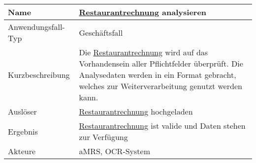 \begin{table}[H]
    \centering
    \label{}
    \begin{tabularx}{\textwidth}{| l | X |}
        \hline
        Name               & \hyperref[gls:restaurantRechnung]{Restaurantrechnung} analysieren                                                                                                                                                       \\
        \hline
        Anwendungsfall-Typ & Geschäftsfall                                                                                                                                                                                                           \\
        \hline
        Kurzbeschreibung   & Die \hyperref[gls:restaurantRechnung]{Restaurantrechnung} wird auf das Vorhandensein aller Pflichtfelder überprüft. Die Analysedaten werden in ein Format gebracht, welches zur Weiterverarbeitung genutzt werden kann. \\
        \hline
        Auslöser           & \hyperref[gls:restaurantRechnung]{Restaurantrechnung} hochgeladen                                                                                                                                                       \\
        \hline
        Ergebnis           & \hyperref[gls:restaurantRechnung]{Restaurantrechnung} ist valide und Daten stehen zur Verfügung                                                                                                                         \\
        \hline
        Akteure            & \ac{aMRS}, OCR-System                                                                                                                                                                                                   \\
        \hline
    \end{tabularx}
\end{table}


